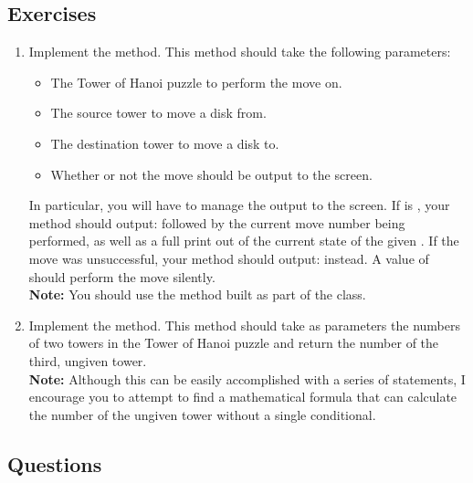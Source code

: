 		\subsection{Exercises}
		 \begin{enumerate}
		 	\item Implement the  method. This method should take the following parameters:
				\begin{itemize}[label=>]
					\item {} The Tower of Hanoi puzzle to perform the move on.
					\item {} The source tower to move a disk from.
					\item {} The destination tower to move a disk to.
					\item {} Whether or not the move should be output to the screen.
				\end{itemize}
				In particular, you will have to manage the output to the screen. If  is , your method should output:  followed by the current move number being performed, as well as a full print out of the current state of the given . If the move was unsuccessful, your method should output:  instead. A  value of  should perform the move silently.\\
				{\small\textbf{Note:} You should use the  method built as part of the  class.}

			\item Implement the  method. This method should take as parameters the numbers of two towers in the Tower of Hanoi puzzle and return the number of the third, ungiven tower.\\
			{\small\textbf{Note:} Although this can be easily accomplished with a series of  statements, I encourage you to attempt to find a mathematical formula that can calculate the number of the ungiven tower without a single conditional.}
		 \end{enumerate}

		\subsection{Questions}
			\ \\[9pt]
	\pagebreak

